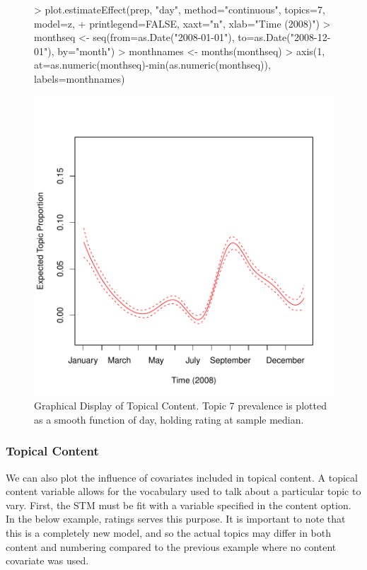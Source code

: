 \documentclass[nojss]{jss}
\begin{document}
\begin{figure}[t!]
\begin{center}
\begin{Schunk}
\begin{Sinput}
> plot.estimateEffect(prep, "day", method="continuous", topics=7, model=z,
+ printlegend=FALSE, xaxt="n", xlab="Time (2008)")
> monthseq <- seq(from=as.Date("2008-01-01"), to=as.Date("2008-12-01"), by="month")
> monthnames <- months(monthseq)
> axis(1, at=as.numeric(monthseq)-min(as.numeric(monthseq)), labels=monthnames)
\end{Sinput}
\end{Schunk}
\includegraphics{stmVignette-014}
\caption{Graphical Display of Topical Content. Topic 7 prevalence is plotted as a smooth function of day, holding rating at sample median.}
\label{fig:spline}
\end{center}
\end{figure}


\subsubsection{Topical Content}
We can also plot the influence of covariates included in topical content. A topical content variable allows for the vocabulary used to talk about a particular topic to vary. First, the STM must be fit with a variable specified in the content option. In the below example, ratings serves this purpose. It is important to note that this is a completely new model, and so the actual topics may differ in both content and numbering compared to the previous example where no content covariate was used.
\end{document}
